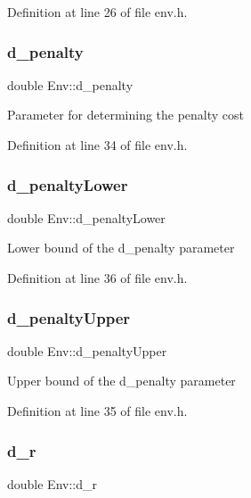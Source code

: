 Definition at line 26 of file env.\+h.

\mbox{\label{class_env_a75f5662133f2d29d710c2bf2e2a34229}} 
\subsubsection{\texorpdfstring{d\+\_\+penalty}{d\_penalty}}
{\footnotesize\ttfamily double Env\+::d\+\_\+penalty}

Parameter for determining the penalty cost 

Definition at line 34 of file env.\+h.

\mbox{\label{class_env_a0524d57e12d574d482af272ce82c95ec}} 
\subsubsection{\texorpdfstring{d\+\_\+penalty\+Lower}{d\_penaltyLower}}
{\footnotesize\ttfamily double Env\+::d\+\_\+penalty\+Lower}

Lower bound of the d\+\_\+penalty parameter 

Definition at line 36 of file env.\+h.

\mbox{\label{class_env_aa6ed2cae83f5d2e6ef14235fad4e050b}} 
\subsubsection{\texorpdfstring{d\+\_\+penalty\+Upper}{d\_penaltyUpper}}
{\footnotesize\ttfamily double Env\+::d\+\_\+penalty\+Upper}

Upper bound of the d\+\_\+penalty parameter 

Definition at line 35 of file env.\+h.

\mbox{\label{class_env_a8642169aafd7eca86c9ecdcccfdb12f2}} 
\subsubsection{\texorpdfstring{d\+\_\+r}{d\_r}}
{\footnotesize\ttfamily double Env\+::d\+\_\+r}

